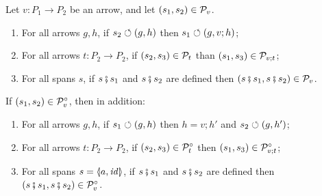 \begin{proposition}
Let $v:P_1\to P_2$ be an arrow, and let $(s_1,s_2)\in \mathcal{P}_v$.
\begin{enumerate}[topsep=\smallskipamount]
\item\label{pattern-preserves} For all arrows $g,h$, if $s_2\circlearrowleft (g,h)$ then $s_1\circlearrowleft (g,v;h)$;
\item\label{pattern-transitive} For all arrows $t:P_2\to P_2$, if $(s_2,s_3)\in \mathcal{P}_t$ than  $(s_1,s_3)\in \mathcal{P}_{v;t}$;
\item\label{pattern-congruence} For all spans $s$, if $s\fatsemi s_1$ and $s \fatsemi s_2$ are defined then $(s\fatsemi s_1,s \fatsemi s_2)\in \mathcal{P}_v$.
\end{enumerate}
If $(s_1,s_2)\in \mathcal{P}^\circ_v$, then in addition:
\begin{enumerate}[resume,topsep=\smallskipamount]
\item\label{conservative-reflects} For all arrows $g,h$, if $s_1\circlearrowleft (g,h)$ then $h=v;h'$ and $s_2\circlearrowleft (g,h')$;
\item\label{conservative-transitive} For all arrows $t:P_2\to P_2$, if $(s_2,s_3)\in \mathcal{P}^\circ_t$ then $(s_1,s_3)\in \mathcal{P}^\circ_{v;t}$;
\item\label{conservative-congruence} For all spans $s=\spanof{a}{\id}$, if $s\fatsemi s_1$ and $s\fatsemi s_2$ are defined then $(s\fatsemi s_1,s\fatsemi s_2)\in \mathcal{P}^\circ_v$.
\end{enumerate}
\end{proposition}
%
